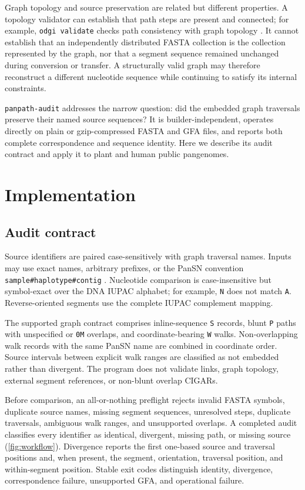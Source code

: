\documentclass[10pt]{article}
\newcommand{\software}[1]{\texttt{#1}}
\begin{document}
Graph topology and source preservation are related but different properties.
A topology validator can establish that path steps are present and connected;
for example, \software{odgi validate} checks path consistency with graph
topology \cite{guarracino2022odgi}. It cannot establish that an independently
distributed FASTA collection is the collection represented by the graph, nor
that a segment sequence remained unchanged during conversion or transfer. A
structurally valid graph may therefore reconstruct a different nucleotide
sequence while continuing to satisfy its internal constraints.

\software{panpath-audit} addresses the narrow question: did the embedded graph
traversals preserve their named source sequences? It is builder-independent,
operates directly on plain or gzip-compressed FASTA and GFA files, and reports
both complete correspondence and sequence identity. Here we describe its audit
contract and apply it to plant and human public pangenomes.

\section{Implementation}

\subsection{Audit contract}

Source identifiers are paired case-sensitively with graph traversal names.
Inputs may use exact names, arbitrary prefixes, or the PanSN convention
\texttt{sample\#haplotype\#contig} \cite{pansnspec}. Nucleotide comparison is
case-insensitive but symbol-exact over the DNA IUPAC alphabet; for example,
\texttt{N} does not match \texttt{A}. Reverse-oriented segments use the complete
IUPAC complement mapping.

The supported graph contract comprises inline-sequence \texttt{S} records,
blunt \texttt{P} paths with unspecified or \texttt{0M} overlaps, and
coordinate-bearing \texttt{W} walks. Non-overlapping walk records with the same
PanSN name are combined in coordinate order. Source intervals between explicit
walk ranges are classified as not embedded rather than divergent. The program
does not validate links, graph topology, external segment references, or
non-blunt overlap CIGARs.

Before comparison, an all-or-nothing preflight rejects invalid FASTA symbols,
duplicate source names, missing segment sequences, unresolved steps, duplicate
traversals, ambiguous walk ranges, and unsupported overlaps. A completed audit
classifies every identifier as identical, divergent, missing path, or missing
source (\cref{fig:workflow}). Divergence reports the first one-based source and
traversal positions and, when present, the segment, orientation, traversal
position, and within-segment position. Stable exit codes distinguish identity,
divergence, correspondence failure, unsupported GFA, and operational failure.
\end{document}
